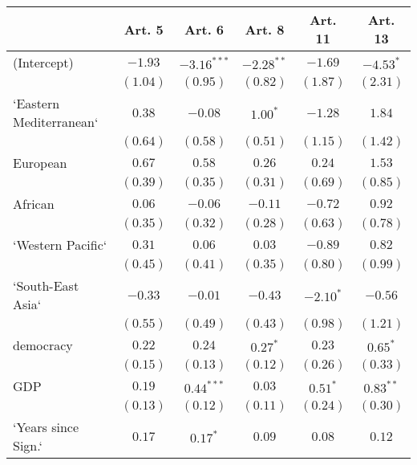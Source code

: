 
\begin{table}[!h]
\begin{center}
\begin{tabular}{l c c c c c }
\toprule
 & Art. 5 & Art. 6 & Art. 8 & Art. 11 & Art. 13 \\
\midrule
(Intercept)             & $-1.93$      & $-3.16^{***}$ & $-2.28^{**}$ & $-1.69$      & $-4.53^{*}$  \\
                        & $(1.04)$     & $(0.95)$      & $(0.82)$     & $(1.87)$     & $(2.31)$     \\
`Eastern Mediterranean` & $0.38$       & $-0.08$       & $1.00^{*}$   & $-1.28$      & $1.84$       \\
                        & $(0.64)$     & $(0.58)$      & $(0.51)$     & $(1.15)$     & $(1.42)$     \\
European                & $0.67$       & $0.58$        & $0.26$       & $0.24$       & $1.53$       \\
                        & $(0.39)$     & $(0.35)$      & $(0.31)$     & $(0.69)$     & $(0.85)$     \\
African                 & $0.06$       & $-0.06$       & $-0.11$      & $-0.72$      & $0.92$       \\
                        & $(0.35)$     & $(0.32)$      & $(0.28)$     & $(0.63)$     & $(0.78)$     \\
`Western Pacific`       & $0.31$       & $0.06$        & $0.03$       & $-0.89$      & $0.82$       \\
                        & $(0.45)$     & $(0.41)$      & $(0.35)$     & $(0.80)$     & $(0.99)$     \\
`South-East Asia`       & $-0.33$      & $-0.01$       & $-0.43$      & $-2.10^{*}$  & $-0.56$      \\
                        & $(0.55)$     & $(0.49)$      & $(0.43)$     & $(0.98)$     & $(1.21)$     \\
democracy               & $0.22$       & $0.24$        & $0.27^{*}$   & $0.23$       & $0.65^{*}$   \\
                        & $(0.15)$     & $(0.13)$      & $(0.12)$     & $(0.26)$     & $(0.33)$     \\
GDP                     & $0.19$       & $0.44^{***}$  & $0.03$       & $0.51^{*}$   & $0.83^{**}$  \\
                        & $(0.13)$     & $(0.12)$      & $(0.11)$     & $(0.24)$     & $(0.30)$     \\
`Years since Sign.`     & $0.17$       & $0.17^{*}$    & $0.09$       & $0.08$       & $0.12$       \\

\end{tabular}
\end{center}
\end{table}
